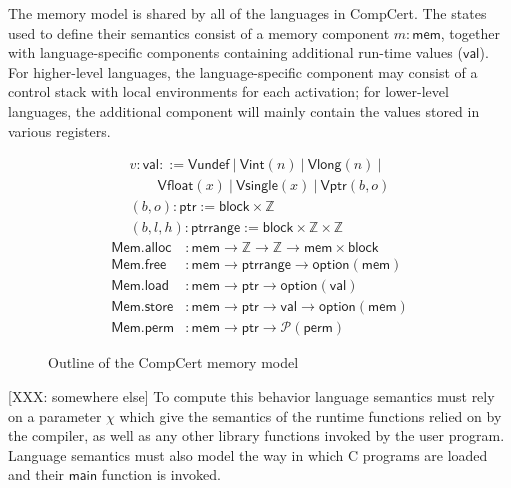 \documentclass[sigplan,10pt,review,anonymous]{acmart}
\newcommand{\kw}[1]{\ensuremath{ \mathsf{#1} }}
\newcommand{\alt}{\ |\ } %
\begin{document}
The memory model is shared by all of the languages in CompCert.
The states used to define their semantics consist of
a memory component $m : \kw{mem}$,
together with language-specific components
containing additional run-time values ($\kw{val}$).
For higher-level languages,
the language-specific component may consist of
a control stack with local environments for each activation;
for lower-level languages,
the additional component will mainly contain
the values stored in various registers.

\begin{figure} %
  \begin{gather*}
        v : \kw{val} ::= 
          \kw{Vundef} \alt
          \kw{Vint}(n) \alt
          \kw{Vlong}(n) \alt \\
         \qquad \kw{Vfloat}(x) \alt
          \kw{Vsingle}(x) \alt
          \kw{Vptr}(b, o)
    \\
    (b, o) : \kw{ptr} :=
      \kw{block} \times \mathbb{Z}
    \\
    (b, l, h) : \kw{ptrrange} :=
      \kw{block} \times \mathbb{Z} \times \mathbb{Z}
  \end{gather*}
  \begin{align*}
    \kw{Mem.alloc} &:
      \kw{mem} \rightarrow \mathbb{Z} \rightarrow \mathbb{Z} \rightarrow
      \kw{mem} \times \kw{block}
    \\
    \kw{Mem.free} &:
      \kw{mem} \rightarrow
      \kw{ptrrange} \rightarrow
      \kw{option}(\kw{mem})
    \\
    \kw{Mem.load} &:
      \kw{mem} \rightarrow \kw{ptr} \rightarrow \kw{option}(\kw{val})
    \\
    \kw{Mem.store} &:
      \kw{mem} \rightarrow \kw{ptr} \rightarrow \kw{val} \rightarrow \kw{option}(\kw{mem})
    \\
    \kw{Mem.perm} &:
      \kw{mem} \rightarrow \kw{ptr} \rightarrow \mathcal{P}(\kw{perm})
  \end{align*}
  \caption{Outline of the CompCert memory model}
  \label{fig:mm}
\end{figure}


\cbstart

[XXX: somewhere else]
To compute this behavior
language semantics must rely on a parameter $\chi$
which give the semantics of the runtime functions
relied on by the compiler,
as well as any other library functions
invoked by the user program.
Language semantics must also model
the way in which C programs are loaded
and their \kw{main} function is invoked.
\end{document}
